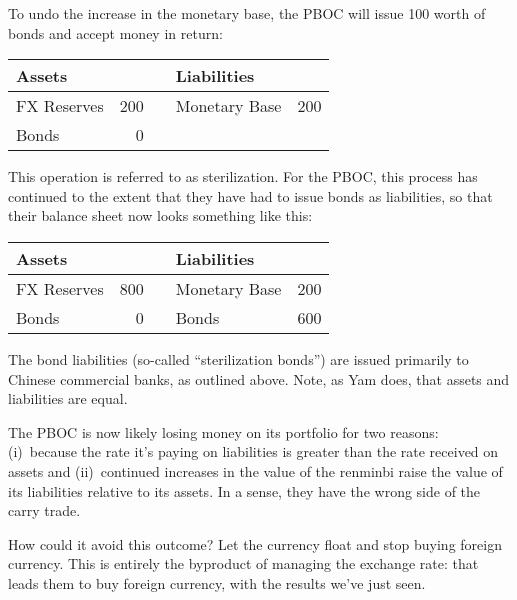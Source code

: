 \documentclass[letterpaper,12pt]{exam}
\begin{document}
\begin{questions}
\begin{solution}
\begin{parts}
\item To undo the increase in the monetary base, the PBOC will issue 100 worth of bonds and accept money in return:
%
\begin{center}
\begin{tabular}{lrclr}
               Assets  &     &&     Liabilities                     \\
               \hline
               FX Reserves &  200 &&     Monetary Base &  200   \\
               Bonds   & 0 && \\
\end{tabular}
\end{center}
%
This operation is referred to as sterilization.
For the PBOC, this process has continued to the extent that they
have had to issue bonds as liabilities, so that their balance sheet now looks something like this:
%
\begin{center}
\begin{tabular}{lrclr}
               Assets  &     &&     Liabilities                     \\
               \hline
               FX Reserves &  800 &&     Monetary Base &  200   \\
               Bonds   &  0 &&    Bonds  &  600 \\
\end{tabular}
\end{center}
%
The bond liabilities (so-called ``sterilization bonds'')
are issued primarily to Chinese commercial banks,
as outlined above.
Note, as Yam does, that assets and liabilities are equal.

\item The PBOC is now likely losing money on its portfolio
for two reasons:
(i)~because the rate it's paying on liabilities is greater than
the rate received on assets and
(ii)~continued increases in the value of the renminbi raise
the value of its liabilities relative to its assets.
In a sense, they have the wrong side of the carry trade.

How could it avoid this outcome?
Let the currency float and stop buying foreign currency.
This is entirely the byproduct of managing the exchange rate:
that leads them to buy foreign currency, with the results
we've just seen.
\end{parts}
\end{solution}


\end{questions}
\end{document}
